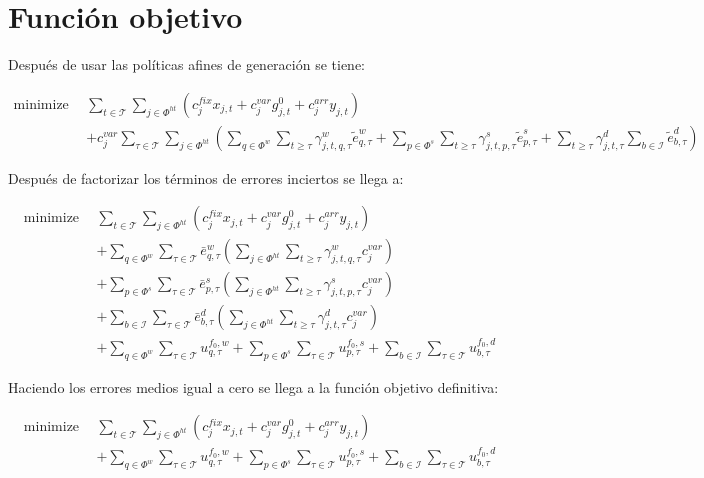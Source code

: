 \chapter{Función objetivo}

Después de usar las políticas afines de generación se tiene:

\begin{align*}
\text{minimize} \ \ & \sum_{t\in\mathcal{T}}\sum_{j\in\Phi^{ht}} {\left( c^{fix}_{j}x_{j,t} + c^{var}_{j}g_{j,t}^{0} + c^{arr}_{j}y_{j,t} \right)} \nonumber \\
& +c^{var}_{j} \sum_{\tau\in\mathcal{T}}\sum_{j\in\Phi^{ht}} {\left( \sum_{q \in \Phi^{w}}\sum_{t \ge \tau} \gamma_{j,t,q,\tau}^{w}\tilde{e}_{q,\tau}^{w} + \sum_{p \in \Phi^{s}}\sum_{t \ge \tau} \gamma_{j,t,p,\tau}^{s}\tilde{e}_{p,\tau}^{s} + \sum_{t \ge \tau}  \gamma_{j,t,\tau}^{d} \sum_{b \in \mathcal{I}}{\tilde{e}_{b,\tau}^{d}} \right)}
\end{align*}

Después de factorizar los términos de errores inciertos se llega a:

\begin{align*}
\text{minimize} \ \ & \sum_{t\in\mathcal{T}}\sum_{j\in\Phi^{ht}} {\left( c^{fix}_{j}x_{j,t} + c^{var}_{j}g_{j,t}^{0} + c^{arr}_{j}y_{j,t} \right)} \\
& + \sum_{q \in \Phi^{w}} \sum_{\tau\in\mathcal{T}} \bar{e}_{q,\tau}^{w} \left( \sum_{j\in\Phi^{ht}} \sum_{t \ge \tau} \gamma_{j,t,q,\tau}^{w}  c^{var}_{j} \right) \\
& + \sum_{p \in \Phi^{s}} \sum_{\tau\in\mathcal{T}} \bar{e}_{p,\tau}^{s} \left( \sum_{j\in\Phi^{ht}} \sum_{t \ge \tau} \gamma_{j,t,p,\tau}^{s} c^{var}_{j} \right) \\
& + \sum_{b \in \mathcal{I}} \sum_{\tau\in\mathcal{T}} \bar{e}_{b,\tau}^{d} \left( \sum_{j\in\Phi^{ht}} \sum_{t \ge \tau} \gamma_{j,t,\tau}^{d} c^{var}_{j} \right)\\
&+ \sum_{q \in \Phi^{w}} \sum_{\tau\in\mathcal{T}} u_{q,\tau}^{f_0, w} + \sum_{p \in \Phi^{s}} \sum_{\tau\in\mathcal{T}} u_{p,\tau}^{f_0, s} + \sum_{b \in \mathcal{I}} \sum_{\tau\in\mathcal{T}} u_{b,\tau}^{f_0, d}
\end{align*}

Haciendo los errores medios igual a cero se llega a la función objetivo definitiva:

\begin{align}
\text{minimize} \ \ & \sum_{t\in\mathcal{T}}\sum_{j\in\Phi^{ht}} {\left( c^{fix}_{j}x_{j,t} + c^{var}_{j}g_{j,t}^{0} + c^{arr}_{j}y_{j,t} \right)} \\
& + \sum_{q \in \Phi^{w}} \sum_{\tau\in\mathcal{T}} u_{q,\tau}^{f_0, w} + \sum_{p \in \Phi^{s}} \sum_{\tau\in\mathcal{T}} u_{p,\tau}^{f_0, s} + \sum_{b \in \mathcal{I}} \sum_{\tau\in\mathcal{T}} u_{b,\tau}^{f_0, d} \nonumber
\end{align}

